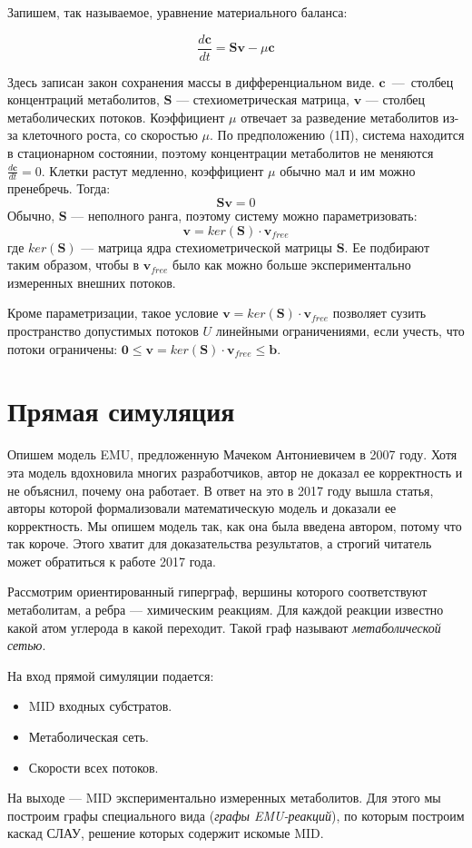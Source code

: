 \documentclass[14pt, a4paper]{extreport}
\begin{document}
Запишем, так называемое, уравнение материального баланса:

$$\frac{d\textbf{c}}{dt} = \textbf{Sv} - \mu{}\textbf{c}$$

Здесь записан закон сохранения массы в дифференциальном виде. $\textbf{c}$~---~столбец концентраций метаболитов, $\textbf{S}$ --- стехиометрическая матрица, $\textbf{v}$ --- столбец метаболических потоков. Коэффициент $\mu$ отвечает за разведение метаболитов из-за клеточного роста, со скоростью $\mu$. По предположению (1П), система находится в стационарном состоянии, поэтому концентрации метаболитов не меняются $\frac{d\textbf{c}}{dt} = 0$. Клетки растут медленно, коэффициент $\mu$ обычно мал и им можно пренебречь. Тогда:
$$ \textbf{Sv} = 0$$
Обычно, $\mathbf{S}$ --- неполного ранга, поэтому систему можно параметризовать:
$$ \mathbf{v} = ker(\mathbf{S}) \cdot \mathbf{v}_{free}$$
где $ker(\textbf{S})$ --- матрица ядра стехиометрической матрицы $\mathbf{S}$. Ее подбирают таким образом, чтобы в $\mathbf{v}_{free}$ было как можно больше экспериментально измеренных внешних потоков.

Кроме параметризации, такое условие $\mathbf{v} = ker(\mathbf{S}) \cdot \mathbf{v}_{free}$ позволяет сузить пространство допустимых потоков $U$ линейными ограничениями, если учесть, что потоки ограничены: $\mathbf{0} \le \mathbf{v} = ker(\mathbf{S}) \cdot \mathbf{v}_{free} \le \mathbf{b}$.



\clearpage
\section{Прямая симуляция}
Опишем модель EMU, предложенную Мачеком Антониевичем в 2007 году\cite{EMU_2007}. Хотя эта модель вдохновила многих разработчиков, автор не доказал ее корректность и не объяснил, почему она работает. В ответ на это в 2017 году вышла статья\cite{formalizm_2017}, авторы которой формализовали математическую модель и доказали ее корректность. Мы опишем модель так, как она была введена автором, потому что так короче. Этого хватит для доказательства результатов, а строгий читатель может обратиться к работе 2017 года. 

Рассмотрим ориентированный гиперграф, вершины которого соответствуют метаболитам, а ребра --- химическим реакциям. Для каждой реакции известно какой атом углерода в какой переходит. Такой граф называют \emph{метаболической сетью}.

На вход прямой симуляции подается:
\begin{itemize}
	\item MID входных субстратов.
	\item Метаболическая сеть.
	\item Скорости всех потоков.
\end{itemize}
На выходе --- MID экспериментально измеренных метаболитов.
Для этого мы построим графы специального вида (\emph{графы EMU-реакций}), по которым построим каскад СЛАУ, решение которых содержит искомые MID.
\end{document}
